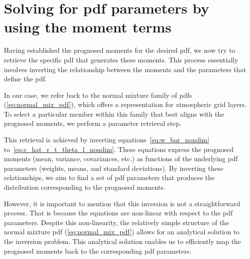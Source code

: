 \section{Solving for pdf parameters by using the moment terms}
\label{sec:solving-for-pdf-parameters-by-using-the-moment-terms}

Having established the prognosed moments for the desired \gls{pdf},
we now try to retrieve the specific \gls{pdf} that generates these moments.
This process essentially involves inverting the relationship between the moments
and the parameters that define the \gls{pdf}.

In our case, we refer back to the normal mixture family of \glspl{pdf} (\cref{eq:normal_mix_pdf}),
which offers a representation for atmospheric grid layers.
To select a particular member within this family that best aligns with the prognosed moments,
we perform a parameter retrieval step.

This retrieval is achieved by inverting equations~\eqref{eq:w_bar_nondim} to~\eqref{eq:c_hat_r_t_theta_l_nondim}.
These equations express the prognosed moments (mean, variance, covariances, etc.)
as functions of the underlying \gls{pdf} parameters (weights, means, and standard deviations).
By inverting these relationships,
we aim to find a set of \gls{pdf} parameters
that produces the distribution corresponding to the prognosed moments.

However, it is important to mention that this inversion is not a straightforward process.
That is because the equations are non-linear with respect to the \gls{pdf} parameters.
Despite this non-linearity,
the relatively simple structure of the normal mixture \gls{pdf} (\cref{eq:normal_mix_pdf})
allows for an analytical solution to the inversion problem.
This analytical solution enables us to efficiently map the prognosed moments
back to the corresponding \gls{pdf} parameters.

